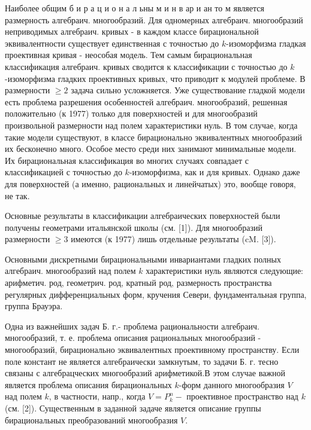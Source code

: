 \documentclass[10pt]{article}
\begin{document}
Наиболее общим б и р а ц и о н а л ьны м и н в ар и ан то м является размерность алгебраич. многообразий. Для одномерных алгебраич. многообразий неприводимых алгебраич. кривых - в каждом классе бирациональной эквивалентности существует единственная с точностью до $k$-изоморфизма гладкая проективная кривая - неособая модель. Тем самым бирациональная классификация алгебраич. кривых сводится к классификации с точностью до $k$-изоморфизма гладких проективных кривых, что приводит к модулей проблеме. В размерности $\geqslant 2$ задача сильно усложняется. Уже существование гладкой модели есть проблема разрешения особенностей алгебраич. многообразий, решенная положительно (к 1977) только для поверхностей и для многообразий произвольной размерности над полем характеристики нуль. В том случае, когда такие модели существуют, в классе бирационально эквивалентных многообразий их бесконечно много. Особое место среди них занимают минимальные модели. Их бирациональная классификация во многих случаях совпадает с классификацией с точностью до $k$-изоморфизма, как и для кривых. Однако даже для поверхностей (а именно, рациональных и линейчатых) это, вообще говоря, не так.



Основные результаты в классификации алгебраических поверхностей были получены геометрами итальянской школы (см. [1]). Для многообразий размерности $\geqslant 3$ имеются (к 1977) лишь отдельные результаты (cM. [3]).



Основными дискретными бирациональными инвариантами гладких полных алгебраич. многообразий над полем $k$ характеристики нуль являются следующие: арифметич. род, геометрич. род, кратный род, размерность пространства регулярных дифференциальных форм, кручения Севери, фундаментальная группа, группа Брауэра.



Одна из важнейших задач Б. г.- проблема рациональности алгебраич. многообразий, т. е. проблема описания рациональных многообразий - многообразий, бирационально эквивалентных проективному пространству. Если поле констант не является алгебраически замкнутым, то задачи Б. г. тесно связаны с алгебрацческих многообразий арифметикой.В этом случае важной является проблема описания бирациональных $k$-форм данного многообразия $V$ над полем $k$, в частности, напр., когда $V=P_{k}^{n}-$ проективное пространство над $k$ (см. [2]). Существенным в заданной задаче является описание группы бирациональных преобразований многообразия $V$.
\end{document}
